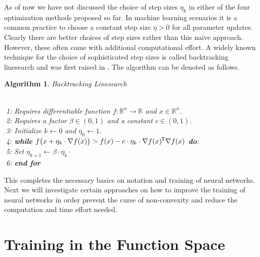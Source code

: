 \documentclass[11pt, a4paper]{article}
\newtheorem{algorithm}[theorem]{Algorithm}
\newcommand{\R}{\mathbb{R}}
\newcommand*{\tr}{^{\mkern-1.5mu\mathsf{T}}}
\begin{document}

As of now we have not discussed the choice of step sizes $\eta_k$ in either of the four optimization methods proposed so far. In machine learning scenarios it is a common practice to choose a constant step size $\eta > 0$ for all parameter updates. Clearly there are better choices of step sizes rather than this naive approach. However, these often come with additional computational effort. A widely known technique for the choice of sophisticated step sizes is called backtracking linesearch and was first raised in \cite{Armijo}. The algorithm can be denoted as follows. 
\begin{algorithm} 
\caption{Backtracking Linesearch \textcolor{white}{$\Big |$}} \ \\
\textcolor{white}{$\Big |$}1: Requires differentiable function $f: \R^n \to \R$ and $x \in \R^n$. \\
\textcolor{white}{$\Big |$}2: Requires a factor $\beta \in (0,1)$ and a constant $c \in (0,1)$. \\ 
\textcolor{white}{$\Big |$}3: Initialize $k \leftarrow 0$ and $\eta_0 \leftarrow 1$. \\
\textcolor{white}{$\Big |$}4: \textbf{while} $f \big (x + \eta_k \cdot \nabla f(x) \big) > f(x) - c \cdot \eta_k \cdot \nabla f(x) \tr \nabla f(x)$ \textbf{do}: \\
\textcolor{white}{$\Big |$}5: \quad Set $\eta_{k+1} \leftarrow \beta \cdot \eta_k \cdot $ \\
\textcolor{white}{$\Big |$}6: \textbf{end for}
\end{algorithm}

This completes the necessary basics on notation and training of neural networks. Next we will investigate certain approaches on how to improve the training of neural networks in order prevent the curse of non-convexity and reduce the computation and time effort needed. \\

\pagebreak
\section{Training in the Function Space} \label{sec:functionspace}
\end{document}
